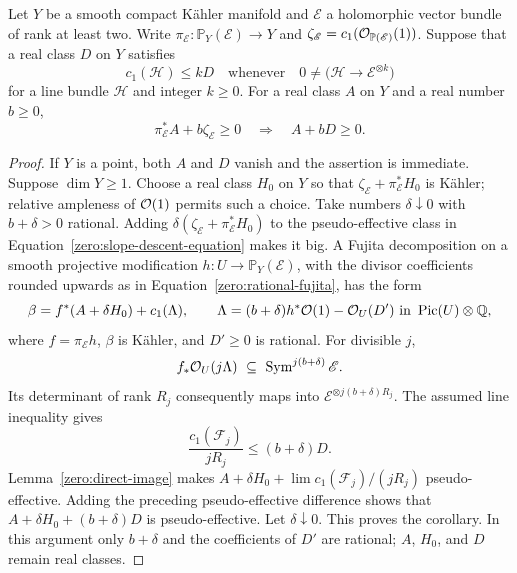 \begin{corollary}\label{zero:slope-descent}
Let \(Y\) be a smooth compact Kähler manifold and \(\mathscr E\) a
holomorphic vector bundle of rank at least two.  Write
\(\pi_{\mathscr E}:\mathbb{P}_Y(\mathscr E)\to Y\) and
\(\zeta_{\mathscr E}=c_1(\mathcal O_{\mathbb{P}(\mathscr E)}(1))\).
Suppose that a real class \(D\) on \(Y\) satisfies
\[
 c_1(\mathscr H)\le kD
 \quad\text{whenever}\quad
 0\ne\bigl(\mathscr H\longrightarrow\mathscr E^{\otimes k}\bigr)
\]
for a line bundle \(\mathscr H\) and integer \(k\ge0\).
For a real class \(A\) on \(Y\) and a real number \(b\ge0\),
\begin{equation}\label{zero:slope-descent-equation}
 \pi_{\mathscr E}^*A+b\zeta_{\mathscr E}\ge0
 \quad\Longrightarrow\quad A+bD\ge0 .
\end{equation}
\end{corollary}

\begin{proof}
If \(Y\) is a point, both \(A\) and \(D\) vanish and the assertion is
immediate.  Suppose \(\dim Y\ge1\).  Choose a real class \(H_0\) on \(Y\) so that
\(\zeta_{\mathscr E}+\pi_{\mathscr E}^*H_0\) is Kähler; relative
ampleness of \(\mathcal O(1)\) permits such a choice.  Take numbers
\(\delta\downarrow0\) with \(b+\delta>0\) rational.  Adding
\(\delta(\zeta_{\mathscr E}+\pi_{\mathscr E}^*H_0)\) to the
pseudo-effective class in Equation~\eqref{zero:slope-descent-equation} makes it
big.  A Fujita decomposition on a smooth projective modification
\(h:U\to\mathbb{P}_Y(\mathscr E)\), with the divisor coefficients rounded
upwards as in Equation~\eqref{zero:rational-fujita}, has the form
\[
 \beta=f^*(A+\delta H_0)+c_1(\Lambda),\qquad
 \Lambda=(b+\delta)h^*\mathcal O(1)-\mathcal O_U(D')
       \ \text{in }\operatorname{Pic}(U)\otimes\mathbb Q,
\]
where \(f=\pi_{\mathscr E}h\), \(\beta\) is Kähler, and \(D'\ge0\)
is rational.  For divisible \(j\),
\[
 f_*\mathcal O_U(j\Lambda)\ \subseteq\
           \operatorname{Sym}^{j(b+\delta)}\mathscr E .
\]
Its determinant of rank \(R_j\) consequently maps into
\(\mathscr E^{\otimes j(b+\delta)R_j}\).  The assumed line inequality
gives
\[
 \frac{c_1(\mathcal F_j)}{jR_j}\le(b+\delta)D.
\]
Lemma~\ref{zero:direct-image} makes
\(A+\delta H_0+\lim c_1(\mathcal F_j)/(jR_j)\) pseudo-effective.
Adding the preceding pseudo-effective difference shows that
\(A+\delta H_0+(b+\delta)D\) is pseudo-effective.  Let
\(\delta\downarrow0\).  This proves the corollary.  In this argument
only \(b+\delta\) and the coefficients of \(D'\) are rational; \(A\),
\(H_0\), and \(D\) remain real classes.
\end{proof}

